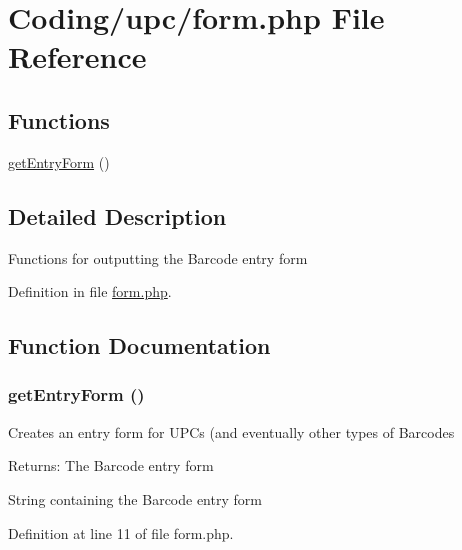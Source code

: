 \hypertarget{form_8php}{
\section{Coding/upc/form.php File Reference}
\label{form_8php}
}
\subsection*{Functions}
\begin{CompactItemize}
\item 
\hyperlink{form_8php_839e205cae656bea01ea99e2de94ef1e}{getEntryForm} ()
\end{CompactItemize}


\subsection{Detailed Description}
Functions for outputting the Barcode entry form 

Definition in file \hyperlink{form_8php-source}{form.php}.

\subsection{Function Documentation}
\hypertarget{form_8php_839e205cae656bea01ea99e2de94ef1e}{
\subsubsection{\setlength{\rightskip}{0pt plus 5cm}getEntryForm ()}}
\label{form_8php_839e205cae656bea01ea99e2de94ef1e}


Creates an entry form for UPCs (and eventually other types of Barcodes

\begin{Desc}
\item[Returns:]The Barcode entry form \end{Desc}


String containing the Barcode entry form 

Definition at line 11 of file form.php.